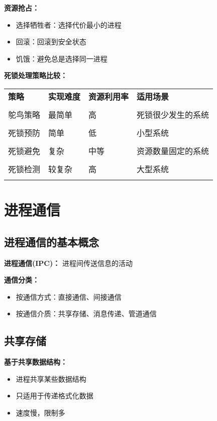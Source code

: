 \documentclass[lang=cn,newtx,10pt,scheme=chinese]{../../elegantbook}
\begin{document}
\textbf{资源抢占：}
\begin{itemize}
  \item 选择牺牲者：选择代价最小的进程
  \item 回滚：回滚到安全状态
  \item 饥饿：避免总是选择同一进程
\end{itemize}

\textbf{死锁处理策略比较：}
\begin{longtable}{@{}p{3cm}p{3cm}p{3cm}p{4cm}@{}}
\toprule
\textbf{策略} & \textbf{实现难度} & \textbf{资源利用率} & \textbf{适用场景} \\\\ \midrule
\endhead

鸵鸟策略 & 最简单 & 高 & 死锁很少发生的系统 \\\\
死锁预防 & 简单 & 低 & 小型系统 \\\\
死锁避免 & 复杂 & 中等 & 资源数量固定的系统 \\\\
死锁检测 & 较复杂 & 高 & 大型系统 \\\\

\bottomrule
\end{longtable}

\section{进程通信}

\subsection{进程通信的基本概念}

\textbf{进程通信(IPC)：}
进程间传送信息的活动

\textbf{通信分类：}
\begin{itemize}
  \item 按通信方式：直接通信、间接通信
  \item 按通信介质：共享存储、消息传递、管道通信
\end{itemize}

\subsection{共享存储}

\textbf{基于共享数据结构：}
\begin{itemize}
  \item 进程共享某些数据结构
  \item 只适用于传递格式化数据
  \item 速度慢，限制多
\end{itemize}
\end{document}
